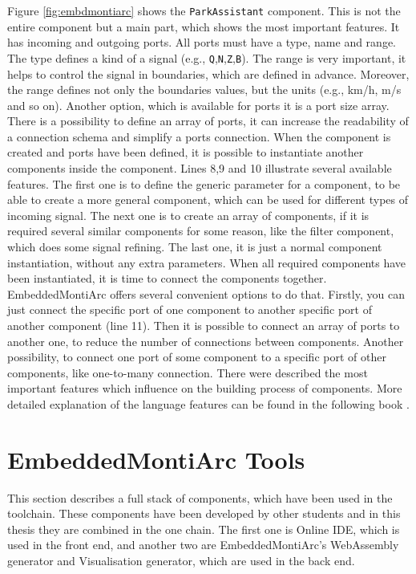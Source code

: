 Figure \ref{fig:embdmontiarc} shows the \texttt{ParkAssistant} component. This is not the entire component but a main part, which shows the most important features. It has incoming and outgoing ports. All ports must have a type, name and range. The type defines a kind of a signal (e.g., \texttt{Q},\texttt{N},\texttt{Z},\texttt{B}). The range is very important, it helps to control the signal in boundaries, which are defined in advance. Moreover, the range defines not only the boundaries values, but the units (e.g., km/h, m/s and so on). Another option, which is available for ports it is a port size array. There is a possibility to define an array of ports, it can increase the readability of a connection schema and simplify a ports connection. When the component is created and ports have been defined, it is possible to instantiate another components inside the component. Lines 8,9 and 10 illustrate several available features. The first one is to define the generic parameter for a component, to be able to create a more general component, which can be used for different types of incoming signal. The next one is to create an array of components, if it is required several similar components for some reason, like the filter component, which does some signal refining. The last one, it is just a normal component instantiation, without any extra parameters. When all required components have been instantiated, it is time to connect the components together. EmbeddedMontiArc offers several convenient options to do that. Firstly, you can just connect the specific port of one component to another specific port of another component (line 11). Then it is possible to connect an array of ports to another one, to reduce the number of connections between components. Another possibility, to connect one port of some component to a specific port of other components, like one-to-many connection. There were described the most important features which influence on the building process of components. More detailed explanation of the language features can be found in the following book \cite{HR17}.

\section{EmbeddedMontiArc Tools} \label{sec:tools}
This section describes a full stack of components, which have been used in the toolchain. These components have been developed by other students and in this thesis they are combined in the one chain. The first one is Online IDE, which is used in the front end, and another two are EmbeddedMontiArc's WebAssembly generator and Visualisation generator, which are used in the back end.


